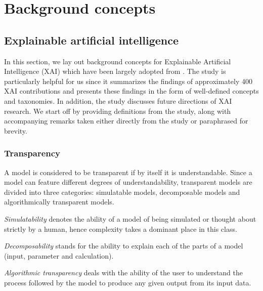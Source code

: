\chapter{Background concepts}

\label{background}

\section{Explainable artificial intelligence}

In this section, we lay out background concepts for Explainable Artificial Intelligence (XAI) which have been largely adopted from \citet{arrieta2020explainable}. The study is particularly helpful for us since it summarizes the findings of approximately 400 XAI contributions and presents these findings in the form of well-defined concepts and taxonomies. In addition, the study discusses future directions of XAI research. We start off by providing definitions from the study, along with accompanying remarks taken either directly from the study or paraphrased for brevity.

\subsection{Transparency}

\begin{definition}[Transparency]
  A model is considered to be transparent if by itself it is understandable. Since a model can feature different degrees of understandability, transparent models are divided into three categories: simulatable models, decomposable models and algorithmically transparent models. 
\end{definition}

\begin{remark}
  \textit{Simulatability} denotes the ability of a model of being simulated or thought about strictly by a human, hence complexity takes a dominant place in this class.
\end{remark}

\begin{remark}
  \textit{Decomposability} stands for the ability to explain each of the parts of a model (input, parameter and calculation).
\end{remark}

\begin{remark}
  \textit{Algorithmic transparency} deals with the ability of the user to understand the process followed by the model to produce any given output from its input data.
\end{remark}

